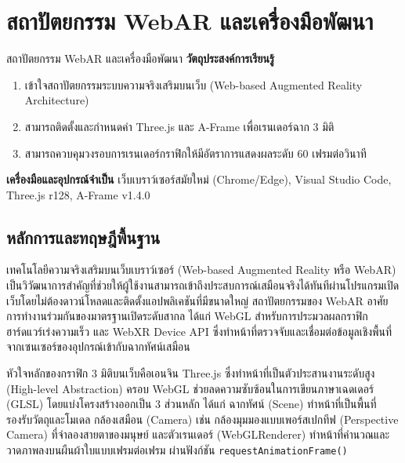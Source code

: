 
\chapter{สถาปัตยกรรม WebAR และเครื่องมือพัฒนา}
\label{ch:lab01}


\vspace{0.4cm}

\begin{labobjectivebox}{สถาปัตยกรรม WebAR และเครื่องมือพัฒนา}
\textbf{วัตถุประสงค์การเรียนรู้}
\begin{enumerate}[leftmargin=1.8cm, itemsep=2pt]
    \item เข้าใจสถาปัตยกรรมระบบความจริงเสริมบนเว็บ (Web-based Augmented Reality Architecture)
    \item สามารถติดตั้งและกำหนดค่า Three.js และ A-Frame เพื่อเรนเดอร์ฉาก 3 มิติ
    \item สามารถควบคุมวงรอบการเรนเดอร์กราฟิกให้มีอัตราการแสดงผลระดับ 60 เฟรมต่อวินาที
\end{enumerate}

\vspace{4pt}
\textbf{เครื่องมือและอุปกรณ์จำเป็น} \enspace เว็บเบราว์เซอร์สมัยใหม่ (Chrome/Edge), Visual Studio Code, Three.js r128, A-Frame v1.4.0
\end{labobjectivebox}

\section{หลักการและทฤษฎีพื้นฐาน}

เทคโนโลยีความจริงเสริมบนเว็บเบราว์เซอร์ (Web-based Augmented Reality หรือ WebAR) เป็นวิวัฒนาการสำคัญที่ช่วยให้ผู้ใช้งานสามารถเข้าถึงประสบการณ์เสมือนจริงได้ทันทีผ่านโปรแกรมเปิดเว็บโดยไม่ต้องดาวน์โหลดและติดตั้งแอปพลิเคชันที่มีขนาดใหญ่ สถาปัตยกรรมของ WebAR อาศัยการทำงานร่วมกันของมาตรฐานเปิดระดับสากล ได้แก่ WebGL สำหรับการประมวลผลกราฟิกฮาร์ดแวร์เร่งความเร็ว และ WebXR Device API ซึ่งทำหน้าที่ตรวจจับและเชื่อมต่อข้อมูลเชิงพื้นที่จากเซนเซอร์ของอุปกรณ์เข้ากับฉากทัศน์เสมือน

หัวใจหลักของกราฟิก 3 มิติบนเว็บคือเอนจิน Three.js ซึ่งทำหน้าที่เป็นตัวประสานงานระดับสูง (High-level Abstraction) ครอบ WebGL ช่วยลดความซับซ้อนในการเขียนภาษาเฉดเดอร์ (GLSL) โดยแบ่งโครงสร้างออกเป็น 3 ส่วนหลัก ได้แก่ ฉากทัศน์ (Scene) ทำหน้าที่เป็นพื้นที่รองรับวัตถุและโมเดล กล้องเสมือน (Camera) เช่น กล้องมุมมองแบบเพอร์สเปกทีฟ (Perspective Camera) ที่จำลองสายตาของมนุษย์ และตัวเรนเดอร์ (WebGLRenderer) ทำหน้าที่คำนวณและวาดภาพลงบนผืนผ้าใบแบบเฟรมต่อเฟรม ผ่านฟังก์ชัน \texttt{requestAnimationFrame()}

